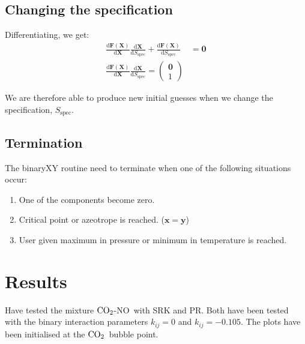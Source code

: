 \documentclass[english]{../thermomemo/thermomemo}
\newcommand*{\td}[2]{\frac{\mathrm{d} #1}{\mathrm{d} #2}}
\newcommand{\spec}{\text{spec}}
\newcommand{\coto}{\ensuremath{\text{CO}_{\text{\scriptsize 2}}}}
\newcommand{\no}{\ensuremath{\text{NO}}}
\begin{document}

\subsection{Changing the specification}
Differentiating, we get:
\begin{align}
\td{\mathbf{F(X)}}{\mathbf{X}}\td{\mathbf{X}}{S_{\spec}} 
+\td{\mathbf{F(X)}}{S_{\spec}} &= \mathbf{0}\\
\td{\mathbf{F(X)}}{\mathbf{X}}\td{\mathbf{X}}{S_{\spec}} 
 = \begin{pmatrix} \mathbf{0}\\
1
\end{pmatrix}
\end{align}

We are therefore able to produce new initial guesses when we change
the specification, $S_{\spec}$.

\subsection{Termination}
The binaryXY routine need to terminate when one of the following
situations occur:
\begin{enumerate}
\item One of the components become zero.
\item Critical point or azeotrope is
  reached. ($\mathbf{x}=\mathbf{y}$) \label{enum:crit}
\item User given maximum in pressure or minimum in temperature is reached. \label{enum:temp} 
\end{enumerate}

\section{Results}
Have tested the mixture \coto-\no~with SRK and PR. Both have been
tested with the binary interaction parameters $k_{ij}=0$ and
$k_{ij}=-0.105$. The plots have been initialised at the \coto~bubble point.
\end{document}
